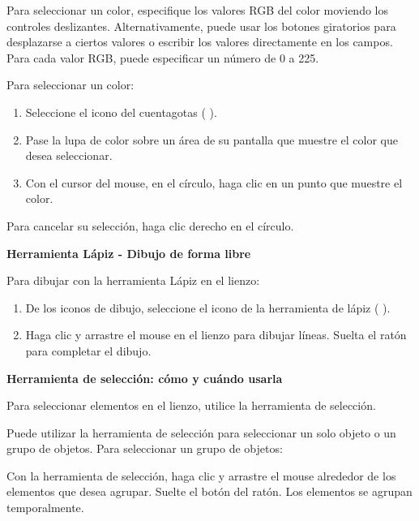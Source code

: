 


Para seleccionar un color, especifique los valores RGB del color moviendo los controles deslizantes. Alternativamente, puede usar los botones giratorios para desplazarse a ciertos valores o escribir los valores directamente en los campos. Para cada valor RGB, puede especificar un número de 0 a 225.




Para seleccionar un color:
\begin{enumerate}
  \item Seleccione el icono del cuentagotas ( ).

\item Pase la lupa de color sobre un área de su pantalla que muestre el color que desea seleccionar.

\item Con el cursor del mouse, en el círculo, haga clic en un punto que muestre el color.
\end{enumerate}

Para cancelar su selección, haga clic derecho en el círculo.

\textbf{Herramienta Lápiz - Dibujo de forma libre}

Para dibujar con la herramienta Lápiz en el lienzo:

\begin{enumerate}
  \item De los iconos de dibujo, seleccione el icono de la herramienta de lápiz ( ).

\item Haga clic y arrastre el mouse en el lienzo para dibujar líneas. Suelta el ratón para completar el dibujo.
\end{enumerate}

\textbf{Herramienta de selección: cómo y cuándo usarla}

Para seleccionar elementos en el lienzo, utilice la herramienta de selección.

Puede utilizar la herramienta de selección para seleccionar un solo objeto o un grupo de objetos. Para seleccionar un grupo de objetos:

Con la herramienta de selección, haga clic y arrastre el mouse alrededor de los elementos que desea agrupar. Suelte el botón del ratón. Los elementos se agrupan temporalmente.

